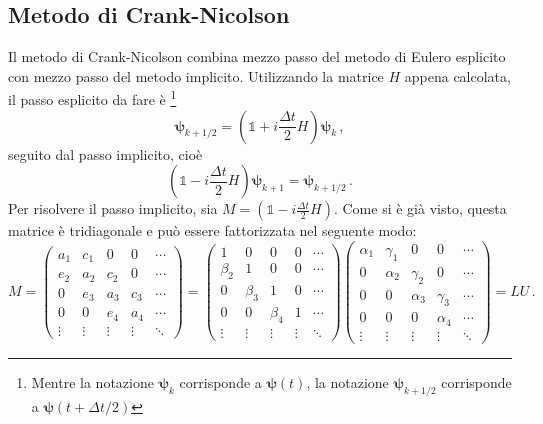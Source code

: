 \documentclass[a4paper, titlepage]{article}
\numberwithin{equation}{section}
\begin{document}
\subsection{Metodo di Crank-Nicolson}
Il metodo di Crank-Nicolson combina mezzo passo del metodo di Eulero esplicito con mezzo passo del metodo implicito. Utilizzando la matrice $H$ appena calcolata, il passo esplicito da fare è \footnote{Mentre la notazione $\bm{\psi}_k$ corrisponde a $\bm{\psi}(t)$, la notazione $\bm{\psi}_{k+1/2}$ corrisponde a $\bm{\psi}(t+\Delta t/2)$}
\begin{equation*}
    \bm{\psi}_{k+1/2} = \left(\mathbb{1} + i\frac{\Delta t}{2} H\right)\bm{\psi}_k\, ,
\end{equation*}
seguito dal passo implicito, cioè
\begin{equation*}
    \left(\mathbb{1} - i\frac{\Delta t}{2} H\right)\bm{\psi}_{k+1} = \bm{\psi}_{k+1/2}\, .
\end{equation*}
Per risolvere il passo implicito, sia $M = \left(\mathbb{1} - i\frac{\Delta t}{2} H\right)$. Come si è già visto, questa matrice è tridiagonale e può essere fattorizzata nel seguente modo:
\begin{equation*} 
    M = 
    \begin{pmatrix}
        a_1 & c_1 & 0 & 0 & \cdots \\
        e_2 & a_2 & c_2 & 0 & \cdots \\
        0 & e_3 & a_3 & c_3 & \cdots \\
        0 & 0 & e_4 & a_4 & \cdots \\
        \vdots & \vdots & \vdots & \vdots & \ddots 
    \end{pmatrix} = 
    \begin{pmatrix}
        1 & 0 & 0 & 0 & \cdots \\
        \beta_2 & 1 & 0 & 0 & \cdots \\
        0 & \beta_3 & 1 & 0 & \cdots \\
        0 & 0 & \beta_4 & 1 & \cdots \\
        \vdots & \vdots & \vdots & \vdots & \ddots 
    \end{pmatrix}
    \begin{pmatrix}
        \alpha_1 & \gamma_1 & 0 & 0 & \cdots \\
        0 & \alpha_2 & \gamma_2 & 0 & \cdots \\
        0 & 0 & \alpha_3 & \gamma_3 & \cdots \\
        0 & 0 & 0 & \alpha_4 & \cdots \\
        \vdots & \vdots & \vdots & \vdots & \ddots 
    \end{pmatrix}
    = LU\, .
\end{equation*}
\end{document}
